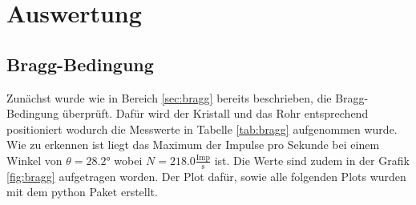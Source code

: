 \section{Auswertung}
\label{sec:Auswertung}
\subsection{Bragg-Bedingung}
Zunächst wurde wie in Bereich \ref{sec:bragg} bereits beschrieben, die Bragg-Bedingung überprüft.
Dafür wird der Kristall und das Rohr entsprechend positioniert wodurch die Messwerte in Tabelle \ref{tab:bragg} aufgenommen wurde.
Wie zu erkennen ist liegt das Maximum der Impulse pro Sekunde bei einem Winkel von $\theta = 28.2 \si{\degree} $ wobei $N = 218.0 \frac{\text{Imp}}{\si{\second}}$ ist.
Die Werte sind zudem in der Grafik \ref{fig:bragg} aufgetragen worden.
Der Plot dafür, sowie alle folgenden Plots wurden mit dem python Paket \cite{matplotlib} erstellt.
